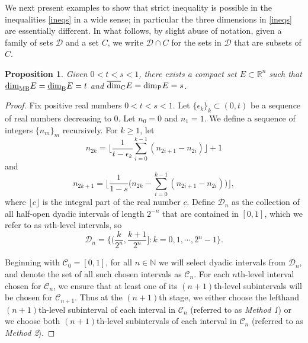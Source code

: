 \documentclass[12pt]{article}
\def\bbbr{\mathbb{R}}
\newcommand{\1}{{\bf 1}}
\newcommand\ucod{\overline{\mbox{\rm dim}}_{\rm C}} %
\newcommand\lbd{\underline{\mbox{\rm dim}}_{\rm B}} %
\newcommand\pkd{\mbox{\rm dim}_{\rm P}} %
\newcommand\mlbd{\underline{\mbox{\rm dim}}_{\rm MB}} %
\newtheorem{prop}[theo]{Proposition}
\begin{document}
We next present examples to show that strict inequality is possible in the inequalities \eqref{ineqs} in a wide sense; in particular the three dimensions in \eqref{ineqs} are essentially different. In what follows, by slight abuse of notation, given a family of sets $\mathcal{D}$ and a set $C$, we write $\mathcal{D} \cap  C $ for the sets in $\mathcal{D}$ that are subsets of $C$.

\begin{prop}\label{example1}
Given $0<t<s<1$, there exists a compact set $E\subset \bbbr^n$ such that $\mlbd E=\lbd E  = t$  and $\ucod E=\pkd E =s$.
\end{prop}

	\begin{proof}
		Fix positive real numbers $0<t<s<1$. Let $\{\epsilon_k\}_k\subset (0,t)$ be a sequence of real numbers  decreasing to $0$. Let  $n_0=0$ and $n_1=1$.  We define a sequence of integers $\{n_m\}_m$ recursively.
		 For $k\geq1$, let
		\begin{equation}\label{n2k}
			n_{2k}=\bigg\lfloor\frac{1}{t-\epsilon_k}\sum_{i=0}^{k-1}(n_{2i+1}-n_{2i})  \bigg\rfloor+1
		\end{equation}	
		and 
		\begin{equation}\label{n2k1}
			n_{2k+1}=\bigg\lfloor\frac{1}{1-s}\Big(n_{2k}-\sum_{i=0}^{k-1}(n_{2i+1}-n_{2i})\Big)\bigg\rfloor,
		\end{equation}	
	 where $\lfloor c\rfloor$ is  the integral part of the real number $c$.
		 Define $\mathcal{D}_n$ as the collection of all half-open dyadic intervals of length  $2^{-n}$  that are contained in $[0,1]$, which we refer to as $n$th-level intervals, so 
		\begin{equation*}
			\mathcal{D}_n=\bigg\{\Big(\frac{k}{2^n},\frac{k+1}{2^n}\Big]:k=0,1,\cdots,2^n-1\bigg\}.
		\end{equation*}

Beginning with $\mathcal{C}_0=[0,1]$, for all   $n\in\mathbb{N}$ we will select dyadic intervals from $\mathcal{D}_n$, and  denote the set of all such chosen intervals as $\mathcal{C}_n$. 
		For each $n$th-level interval chosen for $\mathcal{C}_n$,  we ensure that at least one of  its $(n+1)$th-level subintervals will be chosen for $\mathcal{C}_{n+1}$. 
		 Thus at the $(n+1)$th stage, we either choose the lefthand $(n+1)$th-level subinterval of  each interval in $\mathcal{C}_n$ (referred to as {\it Method 1})  or we choose both	$(n+1)$th-level subintervals of  each  interval in $\mathcal{C}_n$ (referred to as  {\it Method 2}).
		 

\end{proof}
\end{document}
